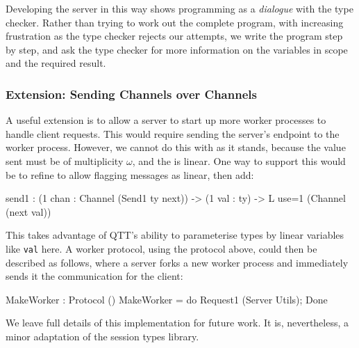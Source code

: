 Developing the server in this way shows programming as a \emph{dialogue}
with the type checker. Rather than trying to work out the complete program,
with increasing frustration as the type checker rejects our attempts, we
write the program step by step, and ask the type checker for more information
on the variables in scope and the required result.

\subsubsection*{Extension: Sending Channels over Channels}

A useful extension is to allow a server to start up more
worker processes to handle client requests. This would require sending the
server's  endpoint to the worker process. However, we cannot do
this with  as it stands, because the value sent must be of
multiplicity $\omega$, and the  is linear. One way to support
this would be to refine  to allow flagging messages as linear,
then add:

\begin{code}
send1 : (1 chan : Channel (Send1 ty next)) -> (1 val : ty) ->
        L {use=1} (Channel (next val))
\end{code}

This takes advantage of QTT's ability to parameterise types by linear variables
like \texttt{val} here. A worker protocol, using the  protocol
above, could then be described as follows, where a server forks a new 
worker process and immediately sends it the communication  for
the client:

\begin{code}
MakeWorker : Protocol ()
MakeWorker = do Request1 (Server Utils); Done
\end{code}

We leave full details of this implementation for future work. It is,
nevertheless, a minor adaptation of the session types library.
